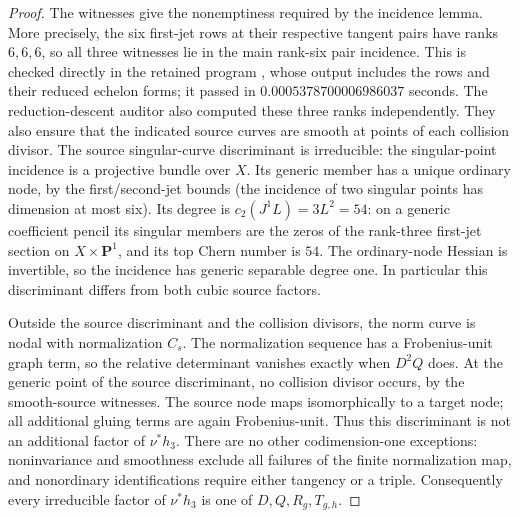 \begin{proof}
The witnesses give the nonemptiness required by the incidence lemma.
More precisely, the six first-jet rows at their respective tangent
pairs have ranks $6,6,6$, so all three witnesses lie in the main
rank-six pair incidence. This is checked directly in the retained
program ,
whose output includes the rows and their reduced echelon forms;
it passed in $0.0005378700006986037$ seconds. The reduction-descent
auditor also computed these three ranks independently.
They also ensure that the indicated source curves are smooth at
points of each collision divisor. The source singular-curve
discriminant is irreducible: the singular-point incidence is a
projective bundle over $X$. Its generic member has a unique ordinary
node, by the first/second-jet bounds (the incidence of two singular
points has dimension at most six). Its degree is
$c_2(J^1L)=3L^2=54$: on a generic coefficient pencil its singular
members are the zeros of the rank-three first-jet section on
$X\times\mathbf P^1$, and its top Chern number is $54$.
The ordinary-node Hessian is invertible, so the incidence has generic
separable degree one. In particular this discriminant differs from
both cubic source factors.

Outside the source discriminant and the collision divisors, the
norm curve is nodal with normalization $C_s$. The normalization
sequence has a Frobenius-unit graph term, so the relative determinant
vanishes exactly when $D^2Q$ does. At the generic point of the source
discriminant, no collision divisor occurs, by the smooth-source
witnesses. The source node maps isomorphically to a target node;
all additional gluing terms are again Frobenius-unit. Thus this
discriminant is not an additional factor of $\nu^*h_3$.
There are no other codimension-one exceptions: noninvariance and
smoothness exclude all failures of the finite normalization map,
and nonordinary identifications require either tangency or a triple.
Consequently every irreducible factor of $\nu^*h_3$ is one of
$D,Q,R_g,T_{g,h}$.


\end{proof}

